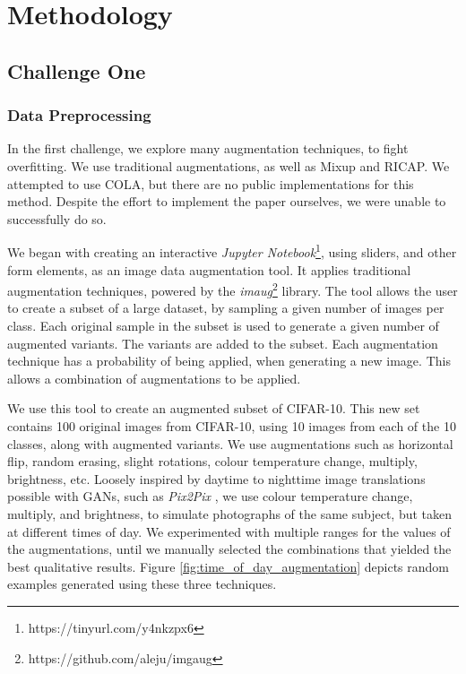 \documentclass[a4paper,11pt]{article}
\begin{document}
\section{Methodology}

\subsection{Challenge One}
\subsubsection{Data Preprocessing}

In the first challenge, we explore many augmentation techniques, to fight overfitting. We use traditional augmentations, as well as Mixup and RICAP. We attempted to use COLA, but there are no public implementations for this method. Despite the effort to implement the paper ourselves, we were unable to successfully do so.

We began with creating an interactive \textit{Jupyter Notebook}\footnote{https://tinyurl.com/y4nkzpx6}, using sliders, and other form elements, as an image data augmentation tool. It applies traditional augmentation techniques, powered by the \textit{imaug}\footnote{https://github.com/aleju/imgaug} library. The tool allows the user to create a subset of a large dataset, by sampling a given number of images per class. Each original sample in the subset is used to generate a given number of augmented variants. The variants are added to the subset. Each augmentation technique has a probability of being applied, when generating a new image. This allows a combination of augmentations to be applied.

We use this tool to create an augmented subset of CIFAR-10. This new set contains 100 original images from CIFAR-10, using 10 images from each of the 10 classes, along with augmented variants. We use augmentations such as horizontal flip, random erasing, slight rotations, colour temperature change, multiply, brightness, etc. Loosely inspired by daytime to nighttime image translations possible with GANs, such as \textit{Pix2Pix} \cite{isola2018imagetoimage}, we use colour temperature change, multiply, and brightness, to simulate photographs of the same subject, but taken at different times of day. We experimented with multiple ranges for the values of the augmentations, until we manually selected the combinations that yielded the best qualitative results. Figure \ref{fig:time_of_day_augmentation} depicts random examples generated using these three techniques. 
\end{document}
